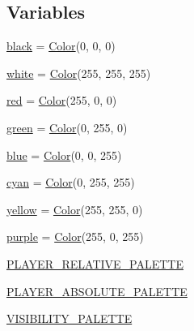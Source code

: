 \subsection*{Variables}
\begin{DoxyCompactItemize}
\item 
\mbox{\hyperlink{namespacepysc2_1_1lib_1_1colors_a37add41a750e4e281c149ca0b1e26171}{black}} = \mbox{\hyperlink{classpysc2_1_1lib_1_1colors_1_1_color}{Color}}(0, 0, 0)
\item 
\mbox{\hyperlink{namespacepysc2_1_1lib_1_1colors_a0325dca99cc825280724506477c24bff}{white}} = \mbox{\hyperlink{classpysc2_1_1lib_1_1colors_1_1_color}{Color}}(255, 255, 255)
\item 
\mbox{\hyperlink{namespacepysc2_1_1lib_1_1colors_acd944331427c35a1b9a0031140af69d1}{red}} = \mbox{\hyperlink{classpysc2_1_1lib_1_1colors_1_1_color}{Color}}(255, 0, 0)
\item 
\mbox{\hyperlink{namespacepysc2_1_1lib_1_1colors_a64e6bc776ebb60cd772930d20e8c6546}{green}} = \mbox{\hyperlink{classpysc2_1_1lib_1_1colors_1_1_color}{Color}}(0, 255, 0)
\item 
\mbox{\hyperlink{namespacepysc2_1_1lib_1_1colors_a509484ea2ad8bba301d137a80c7bf4d5}{blue}} = \mbox{\hyperlink{classpysc2_1_1lib_1_1colors_1_1_color}{Color}}(0, 0, 255)
\item 
\mbox{\hyperlink{namespacepysc2_1_1lib_1_1colors_a617105e0d36f090c7b3746655fcf904e}{cyan}} = \mbox{\hyperlink{classpysc2_1_1lib_1_1colors_1_1_color}{Color}}(0, 255, 255)
\item 
\mbox{\hyperlink{namespacepysc2_1_1lib_1_1colors_a9e788f470ae13da2f10d00cf3e541964}{yellow}} = \mbox{\hyperlink{classpysc2_1_1lib_1_1colors_1_1_color}{Color}}(255, 255, 0)
\item 
\mbox{\hyperlink{namespacepysc2_1_1lib_1_1colors_a6945028eea5ce10d8f5b215c20562eb2}{purple}} = \mbox{\hyperlink{classpysc2_1_1lib_1_1colors_1_1_color}{Color}}(255, 0, 255)
\item 
\mbox{\hyperlink{namespacepysc2_1_1lib_1_1colors_ad26728a45e354e2342bdbca4b84b6561}{P\+L\+A\+Y\+E\+R\+\_\+\+R\+E\+L\+A\+T\+I\+V\+E\+\_\+\+P\+A\+L\+E\+T\+TE}}
\item 
\mbox{\hyperlink{namespacepysc2_1_1lib_1_1colors_a41162e76daca963013e431682a2012b9}{P\+L\+A\+Y\+E\+R\+\_\+\+A\+B\+S\+O\+L\+U\+T\+E\+\_\+\+P\+A\+L\+E\+T\+TE}}
\item 
\mbox{\hyperlink{namespacepysc2_1_1lib_1_1colors_a49a89c28c4139d4865ac3afbaa75dadb}{V\+I\+S\+I\+B\+I\+L\+I\+T\+Y\+\_\+\+P\+A\+L\+E\+T\+TE}}
\item 

\end{DoxyCompactItemize}
